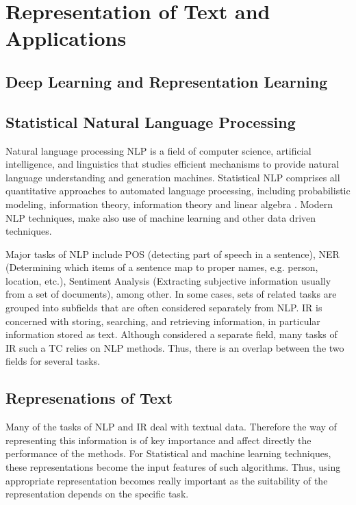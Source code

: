 
\chapter{Representation of Text and Applications}
\label{chap:related_work}

\section{Deep Learning and Representation Learning}
 \label{sec:deep_learning}

\section{Statistical Natural Language Processing}
\label{sec:rel_nlp}
Natural language processing \ac{NLP} is a field of computer science,
artificial intelligence, and linguistics that studies efficient mechanisms to
provide natural language understanding and generation  machines. 
Statistical \ac{NLP} comprises all quantitative approaches to automated
language processing, including probabilistic modeling, information theory,
information theory and linear algebra \cite{Manning:1999:FSN:311445}.  Modern
\ac{NLP}  techniques,  make also use of  machine learning and other data
driven techniques.

Major tasks of \ac{NLP} include  \ac{POS} (detecting part of speech in a
sentence), \ac{NER}  (Determining which items of a sentence map to proper
names, e.g. person, location, etc.),   Sentiment Analysis (Extracting
subjective information usually from a set of documents), among other. 
In some cases, sets of related tasks are grouped into subfields that are often
considered separately from \ac{NLP}. \ac{IR} is concerned with storing,
searching, and retrieving information, in particular  information stored as
text. Although considered a separate field, many tasks of \ac{IR} such a
\ac{TC} relies on \ac{NLP} methods. Thus, there is an overlap between the two
fields for several tasks.



\section{Represenations of Text}
 \label{sec:rel_represenation_text}
  Many of the tasks of \ac{NLP} and \ac{IR} deal with textual data. Therefore
  the way  of representing this information is of key importance and affect
  directly the performance of the methods.  For  Statistical and machine
  learning techniques, these representations become the input features of
  such algorithms. Thus, using appropriate representation  becomes really
  important as the suitability of the representation  depends on the specific
  task.
  
